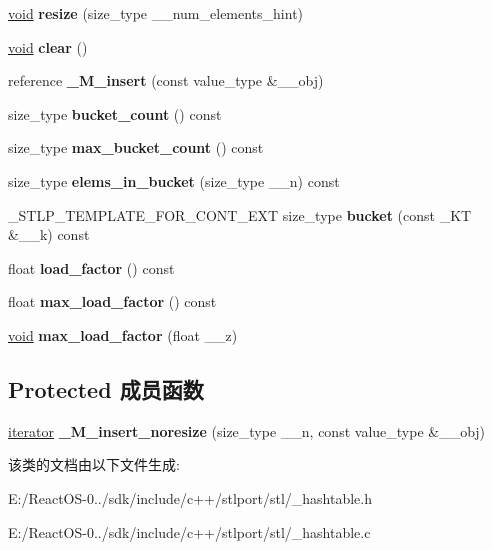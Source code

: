 \begin{DoxyCompactItemize}
\hyperlink{interfacevoid}{void} {\bfseries resize} (size\+\_\+type \+\_\+\+\_\+num\+\_\+elements\+\_\+hint)
\item 
\mbox{\label{classhashtable_acc0ab8ddc2a832b18d760cdf96d2809b}} 
\hyperlink{interfacevoid}{void} {\bfseries clear} ()
\item 
\mbox{\label{classhashtable_a6b2f3071fcced2f436a5b347adc75c73}} 
reference {\bfseries \+\_\+\+M\+\_\+insert} (const value\+\_\+type \&\+\_\+\+\_\+obj)
\item 
\mbox{\label{classhashtable_a849f4d224a597465337740065a151259}} 
size\+\_\+type {\bfseries bucket\+\_\+count} () const
\item 
\mbox{\label{classhashtable_a8a7714cabd613c8696f3697b9c9c8fb9}} 
size\+\_\+type {\bfseries max\+\_\+bucket\+\_\+count} () const
\item 
\mbox{\label{classhashtable_a175e82cb6b966fd93ccbabbbb16d5bb3}} 
size\+\_\+type {\bfseries elems\+\_\+in\+\_\+bucket} (size\+\_\+type \+\_\+\+\_\+n) const
\item 
\mbox{\label{classhashtable_ae2bf062955dc04974a28b25f5eeac2ee}} 
\+\_\+\+S\+T\+L\+P\+\_\+\+T\+E\+M\+P\+L\+A\+T\+E\+\_\+\+F\+O\+R\+\_\+\+C\+O\+N\+T\+\_\+\+E\+XT size\+\_\+type {\bfseries bucket} (const \+\_\+\+KT \&\+\_\+\+\_\+k) const
\item 
\mbox{\label{classhashtable_ad8a5a06468ea64c1ab3f15e05e904526}} 
float {\bfseries load\+\_\+factor} () const
\item 
\mbox{\label{classhashtable_a893d654bd3fb35ee04f4d295b28b4486}} 
float {\bfseries max\+\_\+load\+\_\+factor} () const
\item 
\mbox{\label{classhashtable_a50e0c6b31d67dac674cc64561c767e47}} 
\hyperlink{interfacevoid}{void} {\bfseries max\+\_\+load\+\_\+factor} (float \+\_\+\+\_\+z)
\end{DoxyCompactItemize}
\subsection*{Protected 成员函数}
\begin{DoxyCompactItemize}
\item 
\mbox{\label{classhashtable_a595d23b1283e51c5c3d9f41594b72693}} 
\hyperlink{structiterator}{iterator} {\bfseries \+\_\+\+M\+\_\+insert\+\_\+noresize} (size\+\_\+type \+\_\+\+\_\+n, const value\+\_\+type \&\+\_\+\+\_\+obj)
\end{DoxyCompactItemize}


该类的文档由以下文件生成\+:\begin{DoxyCompactItemize}
\item 
E\+:/\+React\+O\+S-\/0../sdk/include/c++/stlport/stl/\+\_\+hashtable.\+h\item 
E\+:/\+React\+O\+S-\/0../sdk/include/c++/stlport/stl/\+\_\+hashtable.\+c\end{DoxyCompactItemize}
